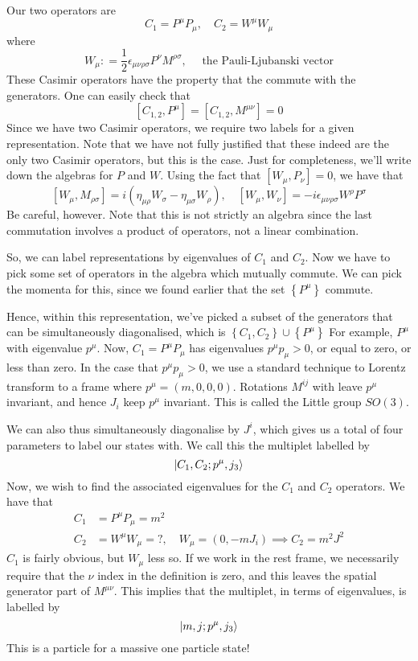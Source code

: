 \documentclass[11pt, oneside]{article}   	%
\theoremstyle{slanted}
\begin{document}
Our two operators are 
\[
C _ 1  = P ^ \mu P _ \mu , \quad C _ 2  = W ^ \mu W _ \mu 
\] where 
\[
W _ \mu : = \frac{1}{2 } \epsilon _{ \mu \nu \rho \sigma  } P ^ \nu M ^{ \rho \sigma } , \quad 
\text{ the Pauli-Ljubanski vector}
\] These Casimir operators 
have the property that the 
commute with the generators. One can easily check that  
\[
\left[  C _{ 1, 2 }, P ^ \mu   \right]   = \left[  C _{ 1, 2 } , M ^{ \mu \nu }  \right]   = 0
\]  Since 
we have two Casimir operators, 
we require two labels for 
a given representation. Note that we have not fully justified that 
these indeed are the only two Casimir operators, 
but this is the case. 
Just for completeness, we'll write 
down the algebras for $ P  $ and $  W $. 
Using the fact that $ \left[  W _ \mu , P _ \nu  \right]   =0 $, 
we have that 
\[
\left[  W _ \mu , M _{ \rho \sigma  }  \right]   = i \left( 
\eta _{ \mu \rho  } W _ \sigma  - \eta _{ \mu \sigma } W _ \rho \right)  , \quad 
\left[  W _\mu , W _ \nu   \right]   = - i \epsilon _{ \mu \nu \rho \sigma } 
W ^ \rho P ^ \sigma 
\] Be careful, however. Note that this is not strictly an algebra since 
the last commutation 
involves a product of operators, 
not a linear combination. 

So, we can label 
representations by eigenvalues of $ C _ 1 $ and $ C _ 2 $. 
Now we have to pick some set of 
operators in the algebra which mutually commute. 
We can pick the momenta for this, since 
we found earlier that the set $ \left\{  P ^ \mu  \right\}  $ 
commute. 

Hence, within this representation, we've picked a subset of the generators that can be simultaneously diagonalised, which is $ \left\{  C _ 1, C _ 2   \right\}  \cup 
\left\{  P ^ \mu  \right\}  $ 
For example, $ P ^ \mu  $ with eigenvalue $ p ^ \mu $. 
Now, $ C _ 1  = P ^ \mu P _ \mu  $ has eigenvalues $ p ^ \mu p _ \mu > 0 $, or equal to zero, 
or less than zero. 
In the case that  $ p ^ \mu p _ \mu > 0 $, we use 
a standard technique
to Lorentz transform to a frame where $ p ^ \mu  = \left( m , 0 , 0  , 0  \right)  $. 
Rotations $ M ^{ ij } $ 
with leave $ p ^ \mu $ invariant, and hence $ J _ i $ keep $ p ^ \mu$ invariant.
This is called the Little group $ SO ( 3 ) $. 

We can also thus simultaneously diagonalise 
by $ J ^ i $, which gives us a total of four 
parameters to label our states with. 
We call this the multiplet labelled by 
\[
 \ket{ C _1 , C _ 2 ; p ^ \mu , j _ 3 } 
\] 
Now, we wish to find the associated eigenvalues 
for the $ C _ 1 $ and $ C _ 2 $ operators. We have that 
\begin{align*}
	C_1  &=  P ^ \mu P _ \mu  = m ^ 2  \\ 
	C_2 &=  W ^ \mu W _ \mu  = ? , \quad W _ \mu  = \left( 0 , 
	 - m J _  i \right) \implies C _ 2  = m ^ 2 J ^ 2   
\end{align*}
$ C _ 1 $ is fairly obvious, but $ W _ \mu $ less so. 
If we work in the rest frame, we 
necessarily require that the $ \nu $ index in
the definition is zero, and this leaves 
the spatial generator part of $ M ^{ \mu \nu } $. 
This implies that the multiplet, in terms of eigenvalues, 
is labelled by 
\[
 \ket{ m , j ; p ^ \mu , j _ 3 } 
\] This is a particle for a 
massive one particle state! 
\end{document}
